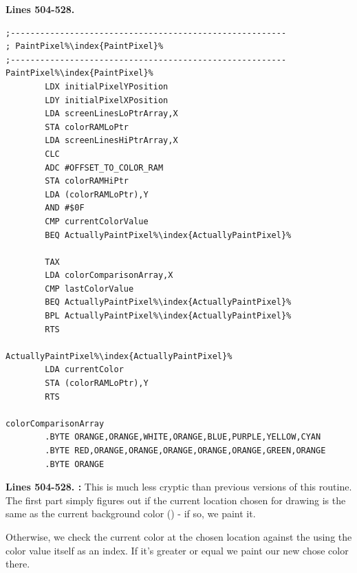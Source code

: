\textbf{Lines 504-528. } 
\begin{lstlisting}[caption = All the pattern data structures in Psychedelia organized into a set of arrays.,escapechar=\%]
;--------------------------------------------------------
; PaintPixel%\index{PaintPixel}%
;--------------------------------------------------------
PaintPixel%\index{PaintPixel}%   
        LDX initialPixelYPosition
        LDY initialPixelXPosition
        LDA screenLinesLoPtrArray,X
        STA colorRAMLoPtr
        LDA screenLinesHiPtrArray,X
        CLC 
        ADC #OFFSET_TO_COLOR_RAM
        STA colorRAMHiPtr
        LDA (colorRAMLoPtr),Y
        AND #$0F
        CMP currentColorValue
        BEQ ActuallyPaintPixel%\index{ActuallyPaintPixel}%

        TAX 
        LDA colorComparisonArray,X
        CMP lastColorValue
        BEQ ActuallyPaintPixel%\index{ActuallyPaintPixel}%
        BPL ActuallyPaintPixel%\index{ActuallyPaintPixel}%
        RTS 

ActuallyPaintPixel%\index{ActuallyPaintPixel}%   
        LDA currentColor
        STA (colorRAMLoPtr),Y
        RTS 

colorComparisonArray   
        .BYTE ORANGE,ORANGE,WHITE,ORANGE,BLUE,PURPLE,YELLOW,CYAN
        .BYTE RED,ORANGE,ORANGE,ORANGE,ORANGE,ORANGE,GREEN,ORANGE
        .BYTE ORANGE

\end{lstlisting}
\clearpage

\textbf{Lines 504-528. :} This is much less cryptic than previous versions of this routine. The first part
simply figures out if the current location chosen for drawing is the same as the current background color () - if so,
we paint it.

Otherwise, we check the current color at the chosen location against the  using the color value itself as an index.
If it's greater or equal we paint our new chose color there.


\vspace*{\fill}
